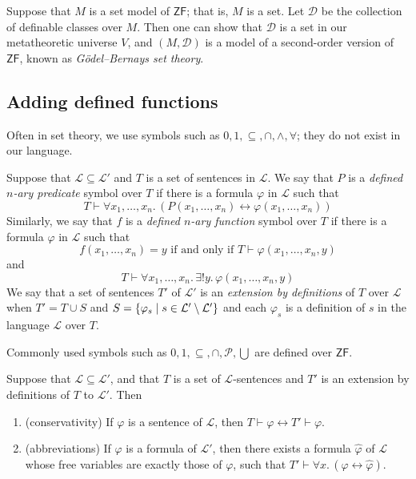 Suppose that \( M \) is a set model of \( \mathsf{ZF} \); that is, \( M \) is a set.
Let \( \mathcal D \) be the collection of definable classes over \( M \).
Then one can show that \( \mathcal D \) is a set in our metatheoretic universe \( V \), and \( (M, \mathcal D) \) is a model of a second-order version of \( \mathsf{ZF} \), known as \emph{G\"odel--Bernays set theory}.

\subsection{Adding defined functions}
Often in set theory, we use symbols such as \( 0, 1, \subseteq, \cap, \wedge, \forall \); they do not exist in our language.
\begin{definition}
    Suppose that \( \mathcal L \subseteq \mathcal L' \) and \( T \) is a set of sentences in \( \mathcal L \).
    We say that \( P \) is a \emph{defined \( n \)-ary predicate} symbol over \( T \) if there is a formula \( \varphi \) in \( \mathcal L \) such that
    \[ T \vdash \forall x_1, \dots, x_n.\, (P(x_1, \dots, x_n) \leftrightarrow \varphi(x_1, \dots, x_n)) \]
    Similarly, we say that \( f \) is a \emph{defined \( n \)-ary function} symbol over \( T \) if there is a formula \( \varphi \) in \( \mathcal L \) such that
    \[ f(x_1, \dots, x_n) = y \text{ if and only if } T \vdash \varphi(x_1, \dots, x_n, y) \]
    and
    \[ T \vdash \forall x_1, \dots, x_n.\, \exists! y.\, \varphi(x_1, \dots, x_n, y) \]
    We say that a set of sentences \( T' \) of \( \mathcal L' \) is an \emph{extension by definitions} of \( T \) over \( \mathcal L \) when \( T' = T \cup S \) and \( S = \qty{\varphi_s \mid s \in \mathcal L' \setminus \mathcal L'} \) and each \( \varphi_s \) is a definition of \( s \) in the language \( \mathcal L \) over \( T \).
\end{definition}
Commonly used symbols such as \( 0, 1, \subseteq, \cap, \mathcal P, \bigcup \) are defined over \( \mathsf{ZF} \).
\begin{theorem}
    Suppose that \( \mathcal L \subseteq \mathcal L' \), and that \( T \) is a set of \( \mathcal L \)-sentences and \( T' \) is an extension by definitions of \( T \) to \( \mathcal L' \).
    Then
    \begin{enumerate}
        \item (conservativity) If \( \varphi \) is a sentence of \( \mathcal L \), then \( T \vdash \varphi \leftrightarrow T' \vdash \varphi \).
        \item (abbreviations) If \( \varphi \) is a formula of \( \mathcal L' \), then there exists a formula \( \hat\varphi \) of \( \mathcal L \) whose free variables are exactly those of \( \varphi \), such that \( T' \vdash \forall x.\, (\varphi \leftrightarrow \hat\varphi) \).
    \end{enumerate}
\end{theorem}
